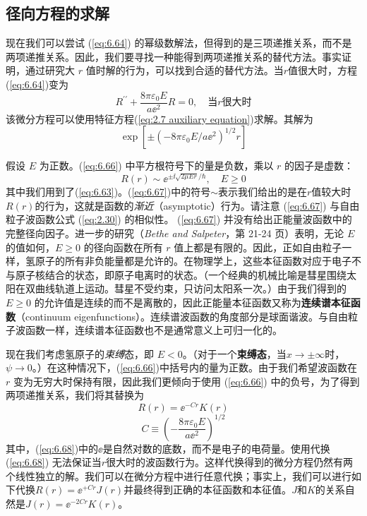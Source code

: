 \subsection*{径向方程的求解}
   现在我们可以尝试 (\ref{eq:6.64}) 的幂级数解法，但得到的是三项递推关系，而不是两项递推关系。因此，我们要寻找一种能得到两项递推关系的替代方法。事实证明，通过研究大 $r$ 值时解的行为，可以找到合适的替代方法。当$r$值很大时，方程(\ref{eq:6.64})变为
   \begin{equation}
        R^{\prime\prime} + \frac{8\pi\varepsilon_0E}{a\ee ^2}R = 0, \quad \text{当}r\text{很大时}
        \label{eq:6.65}
   \end{equation}
   该微分方程可以使用特征方程(\ref{eq:2.7 auxiliary equation})求解。其解为
   \begin{equation}
        \exp\left[\pm\left(-8\pi\varepsilon_0E/a\ee ^2\right)^{1/2}r\right]
        \label{eq:6.66}
   \end{equation}

   假设 $E$ 为正数。(\ref{eq:6.66}) 中平方根符号下的量是负数，乘以 $r$ 的因子是虚数：
   \begin{equation}
        R\left(r\right) \sim \ee ^{\pm \ii \sqrt{2\mu Er}/\hbar}, \quad E \geq 0
        \label{eq:6.67}
   \end{equation}
   其中我们用到了(\ref{eq:6.63})。(\ref{eq:6.67})中的符号$\sim$表示我们给出的是在$r$值较大时$R\left(r\right)$的行为，这就是函数的\textit{渐近}（asymptotic）行为。请注意 (\ref{eq:6.67}) 与自由粒子波函数公式 (\ref{eq:2.30}) 的相似性。 (\ref{eq:6.67}) 并没有给出正能量波函数中的完整径向因子。进一步的研究（\textit{Bethe and Salpeter}，第 21-24 页）表明，无论 $E$ 的值如何，$E \geq 0$ 的径向函数在所有 $r$ 值上都是有限的。因此，正如自由粒子一样，氢原子的所有非负能量都是允许的。在物理学上，这些本征函数对应于电子不与原子核结合的状态，即原子电离时的状态。（一个经典的机械比喻是彗星围绕太阳在双曲线轨道上运动。彗星不受约束，只访问太阳系一次。）由于我们得到的 $E \geq 0$ 的允许值是连续的而不是离散的，因此正能量本征函数又称为\textbf{连续谱本征函数}（continuum eigenfunctions）。连续谱波函数的角度部分是球面谐波。与自由粒子波函数一样，连续谱本征函数也不是通常意义上可归一化的。

   现在我们考虑氢原子的\textit{束缚}态，即 $E < 0$。（对于一个\textbf{束缚态}，当$x \to \pm \infty$时，$\psi \to 0$。）在这种情况下，(\ref{eq:6.66})中括号内的量为正数。由于我们希望波函数在 $r$ 变为无穷大时保持有限，因此我们更倾向于使用 (\ref{eq:6.66}) 中的负号，为了得到两项递推关系，我们将其替换为
   \begin{equation}
        R\left(r\right) = \ee ^{-Cr}K\left(r\right)
        \label{eq:6.68}
   \end{equation}
   \begin{equation}
        C \equiv \left(-\frac{8\pi\varepsilon_0E}{a\ee ^2}\right)^{1/2}
        \label{eq:6.69}
   \end{equation}
   其中，(\ref{eq:6.68})中的$\ee $是自然对数的底数，而不是电子的电荷量。使用代换 (\ref{eq:6.68}) 无法保证当$r$很大时的波函数行为。这样代换得到的微分方程仍然有两个线性独立的解。我们可以在微分方程中进行任意代换；事实上，我们可以进行如下代换$R\left(r\right) = \ee ^{+Cr}J\left(r\right)$并最终得到正确的本征函数和本征值。$J$和$K$的关系自然是$J\left(r\right) = \ee ^{-2Cr}K\left(r\right)$。

